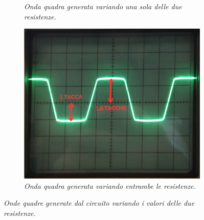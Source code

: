 \begin{figure}[h]
\begin{subfigure}{0.3\textwidth}
        \caption{\emph{Onda quadra generata variando una sola delle due resistenze.}}
        \label{fig : resistenze diverse 1}
      \end{subfigure}
      \hfill
      \begin{subfigure}{0.3\textwidth}
        \centering
        \includegraphics[width=\textwidth]{../assets/Resistenze_Diverse2.png}
        \caption{\emph{Onda quadra generata variando entrambe le resistenze.}}
        \label{fig : resistenze diverse 2}
      \end{subfigure}
      \caption{\emph{Onde quadre generate dal circuito variando i valori delle due resistenze.}}
    \label{fig : dati raccolti}
  \end{figure}

